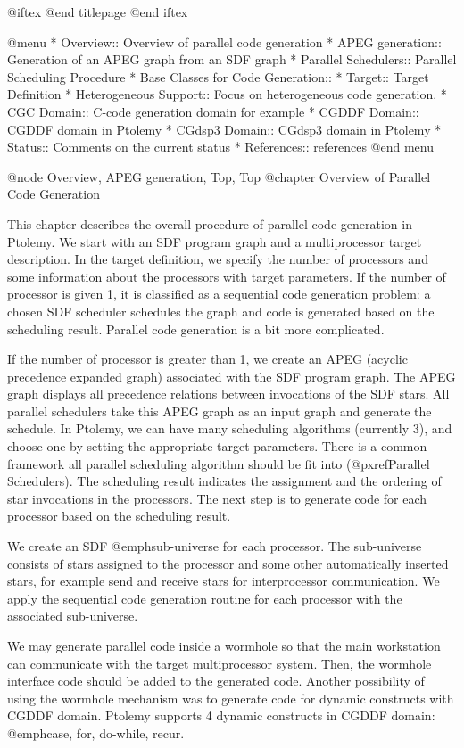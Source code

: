 @iftex
@end titlepage
@end iftex

@menu
* Overview::              	Overview of parallel code generation
* APEG generation::		Generation of an APEG graph from an SDF graph
* Parallel Schedulers::         Parallel Scheduling Procedure
* Base Classes for Code Generation:: 
* Target::          		Target Definition
* Heterogeneous Support::	Focus on heterogeneous code generation.
* CGC Domain::			C-code generation domain for example
* CGDDF Domain::		CGDDF domain in Ptolemy
* CGdsp3 Domain::		CGdsp3 domain in Ptolemy
* Status::			Comments on the current status
* References::			references
@end menu

@node Overview, APEG generation, Top, Top
@chapter Overview of Parallel Code Generation

This chapter describes the overall procedure of parallel code generation
in Ptolemy. We start with an SDF program graph and a multiprocessor
target description. In the target definition, we specify the number of
processors and some information about the processors with target parameters.
If the number of processor is given 1, it is classified as a sequential
code generation problem: a chosen
SDF scheduler schedules the graph and code is generated based on the
scheduling result. Parallel code generation is a bit more complicated.

If the number of processor is greater than 1, we create an APEG (acyclic
precedence expanded graph) associated with the SDF program graph. The APEG
graph displays all precedence relations between invocations of the SDF
stars. All parallel schedulers take this APEG graph as an input graph
and generate the schedule. In Ptolemy, we can have many scheduling
algorithms (currently 3), and choose one by setting the appropriate
target parameters. There is a common framework all parallel scheduling
algorithm should be fit into (@pxref{Parallel Schedulers}). The scheduling
result indicates the assignment and the ordering of star invocations
in the processors. The next step is to generate code for each processor
based on the scheduling result.

We create an SDF @emph{sub-universe} for each processor. The sub-universe
consists of stars assigned to the processor and some other automatically
inserted stars, for example send and receive stars for interprocessor
communication. We apply the sequential code generation routine for
each processor with the associated sub-universe.

We may generate parallel code inside a wormhole so that the main
workstation can communicate with the target multiprocessor system. 
Then, the wormhole interface code should be added to the generated code.
Another possibility of using the wormhole mechanism was to generate code
for dynamic constructs with CGDDF domain. Ptolemy supports 4 dynamic 
constructs in CGDDF domain: @emph{case, for, do-while, recur}.


